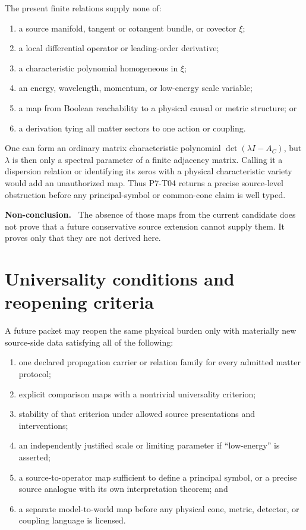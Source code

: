 \documentclass[11pt]{article}
\newenvironment{nonconclusion}{\par\smallskip\noindent\textbf{Non-conclusion.}\ }{\par\smallskip}
\begin{document}
The present finite relations supply none of:
\begin{enumerate}[leftmargin=*]
\item a source manifold, tangent or cotangent bundle, or covector \(\xi\);
\item a local differential operator or leading-order derivative;
\item a characteristic polynomial homogeneous in \(\xi\);
\item an energy, wavelength, momentum, or low-energy scale variable;
\item a map from Boolean reachability to a physical causal or metric
  structure; or
\item a derivation tying all matter sectors to one action or coupling.
\end{enumerate}

One can form an ordinary matrix characteristic polynomial
\(\det(\lambda I-A_C)\), but \(\lambda\) is then only a spectral parameter of
a finite adjacency matrix.  Calling it a dispersion relation or identifying
its zeros with a physical characteristic variety would add an unauthorized
map.  Thus P7-T04 returns a precise source-level obstruction before any
principal-symbol or common-cone claim is well typed.

\begin{nonconclusion}
The absence of those maps from the current candidate does not prove that a
future conservative source extension cannot supply them.  It proves only
that they are not derived here.
\end{nonconclusion}

\section{Universality conditions and reopening criteria}

A future packet may reopen the same physical burden only with materially new
source-side data satisfying all of the following:
\begin{enumerate}[leftmargin=*]
\item one declared propagation carrier or relation family for every admitted
  matter protocol;
\item explicit comparison maps with a nontrivial universality criterion;
\item stability of that criterion under allowed source presentations and
  interventions;
\item an independently justified scale or limiting parameter if
  ``low-energy'' is asserted;
\item a source-to-operator map sufficient to define a principal symbol, or a
  precise source analogue with its own interpretation theorem; and
\item a separate model-to-world map before any physical cone, metric,
  detector, or coupling language is licensed.
\end{enumerate}
\end{document}
